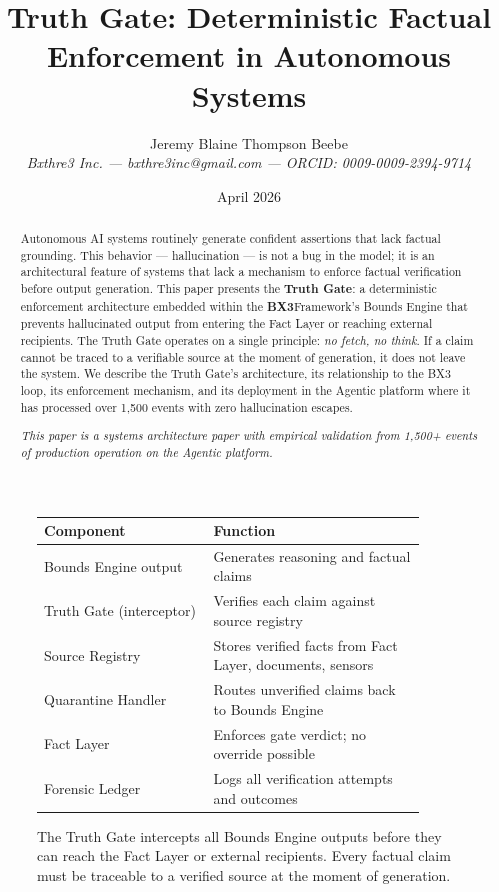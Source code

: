 \documentclass[12pt]{article}
\title{Truth Gate: Deterministic Factual Enforcement in Autonomous Systems}
\author{Jeremy Blaine Thompson Beebe\\
\textit{Bxthre3 Inc. --- bxthre3inc@gmail.com --- ORCID: 0009-0009-2394-9714}}
\date{April 2026}
\newcommand{\bxthree}{\textbf{BX3}}
\begin{document}
\maketitle

\begin{figure}[htbp]
\centering
\caption{The Truth Gate intercepts all Bounds Engine outputs before they can reach the Fact Layer or external recipients. Every factual claim must be traceable to a verified source at the moment of generation.}
\label{fig:truth-gate-arch}
\bigskip
\begin{tabular}{p{0.40\linewidth}p{0.50\linewidth}}
\toprule
\textbf{Component} & \textbf{Function} \\
\midrule
Bounds Engine output & Generates reasoning and factual claims \\
\midrule
Truth Gate (interceptor) & Verifies each claim against source registry \\
\midrule
Source Registry & Stores verified facts from Fact Layer, documents, sensors \\
\midrule
Quarantine Handler & Routes unverified claims back to Bounds Engine \\
\midrule
Fact Layer & Enforces gate verdict; no override possible \\
\midrule
Forensic Ledger & Logs all verification attempts and outcomes \\
\bottomrule
\end{tabular}
\end{figure}

\thispagestyle{fancy}

\begin{abstract}
\noindent
Autonomous AI systems routinely generate confident assertions that lack factual grounding. This behavior --- hallucination --- is not a bug in the model; it is an architectural feature of systems that lack a mechanism to enforce factual verification before output generation. This paper presents the \textbf{Truth Gate}: a deterministic enforcement architecture embedded within the \bxthree Framework's Bounds Engine that prevents hallucinated output from entering the Fact Layer or reaching external recipients. The Truth Gate operates on a single principle: \textit{no fetch, no think}. If a claim cannot be traced to a verifiable source at the moment of generation, it does not leave the system. We describe the Truth Gate's architecture, its relationship to the BX3 loop, its enforcement mechanism, and its deployment in the Agentic platform where it has processed over 1,500 events with zero hallucination escapes.

\vspace{0.5em}
\noindent\textit{This paper is a systems architecture paper with empirical validation from 1,500+ events of production operation on the Agentic platform.}
\end{abstract}
\end{document}
